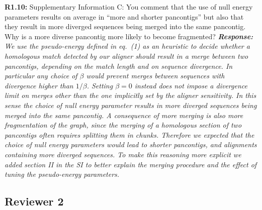 \documentclass[aps,rmp,onecolumn]{revtex4-1}
\newcommand{\reviewer}[2]{\textbf{#1:} #2\vskip 5mm}
\newcommand{\response}[1]{{\it {\color{response}\textbf{Response:} #1}}\vskip 5mm}
\newcommand{\SIalgo}{II}
\begin{document}
\reviewer{R1.10}{Supplementary Information C: You comment that the use of null energy parameters results on average in ``more and shorter pancontigs'' but also that they result in more diverged sequences being merged into the same pancontig. Why is a more diverse pancontig more likely to become fragmented?}
\response{We use the pseudo-energy defined in eq.~(1) as an heuristic to decide whether a homologous match detected by our aligner should result in a merge between two pancontigs, depending on the match length and on sequence divergence. In particular any choice of $\beta$ would prevent merges between sequences with divergence higher than $1/\beta$. Setting $\beta=0$ instead does not impose a divergence limit on merges other than the one implicitly set by the aligner sensitivity. In this sense the choice of null energy parameter results in more diverged sequences being merged into the same pancontig. A consequence of more merging is also more fragmentation of the graph, since the merging of a homologous section of two pancontigs often requires splitting them in chunks. Therefore we expected that the choice of null energy parameters would lead to shorter pancontigs, and alignments containing more diverged sequences.
To make this reasoning more explicit we added section {\SIalgo} in the SI to better explain the merging procedure and the effect of tuning the pseudo-energy parameters.}


\subsection*{Reviewer 2}
\end{document}
